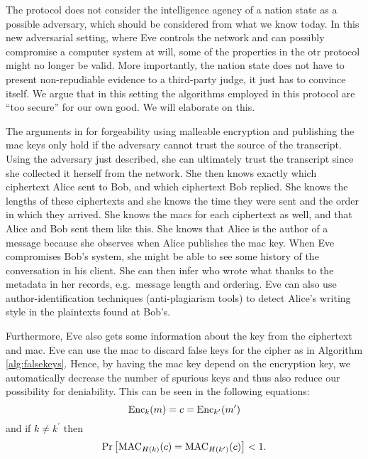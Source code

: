 The protocol does not consider the intelligence agency of a nation state as 
a possible adversary, which should be considered from what we know today.
In this new adversarial setting, where Eve controls the network and can 
possibly compromise a computer system at will, some of the properties in the 
\ac{otr} protocol might no longer be valid.
More importantly, the nation state does not have to present non-repudiable 
evidence to a third-party judge, it just has to convince itself.
We argue that in this setting the algorithms employed in this protocol are 
\enquote{too secure} for our own good.
We will elaborate on this.

The arguments in \cite{otr2004} for forgeability using malleable encryption and 
publishing the \ac{mac} keys only hold if the adversary cannot trust the source 
of the transcript.
Using the adversary just described, she can ultimately trust the transcript 
since she collected it herself from the network.
She then knows exactly which ciphertext Alice sent to Bob, and which ciphertext 
Bob replied.
She knows the lengths of these ciphertexts and she knows the time they were 
sent and the order in which they arrived.
She knows the \acp{mac} for each ciphertext as well, and that Alice and Bob 
sent them like this.
She knows that Alice is the author of a message because she observes when Alice 
publishes the \ac{mac} key.
When Eve compromises Bob's system, she might be able to see some history of the 
conversation in his client.
She can then infer who wrote what thanks to the metadata in her records, e.g.\ 
message length and ordering.
Eve can also use author-identification techniques (anti-plagiarism tools) to 
detect Alice's writing style in the plaintexts found at Bob's.

Furthermore, Eve also gets some information about the key from the ciphertext 
and \ac{mac}.
Eve can use the \ac{mac} to discard false keys for the cipher as in Algorithm 
\ref{alg:falsekeys}.
Hence, by having the \ac{mac} key depend on the encryption key, we 
automatically decrease the number of spurious keys and thus also reduce our 
possibility for deniability.
This can be seen in the following equations:
\begin{equation*}
  \operatorname{\mathrm{Enc}}_k( m ) = c = \operatorname{\mathrm{Enc}}_{k^\prime}( m^\prime )
\end{equation*}
and if \(k\neq k^\prime\) then
\begin{equation*}
  \Pr\left[
    \operatorname{\mathrm{MAC}}_{H(k)}( c ) = \operatorname{\mathrm{MAC}}_{H(k^\prime)}( c )
  \right] < 1.
\end{equation*}

